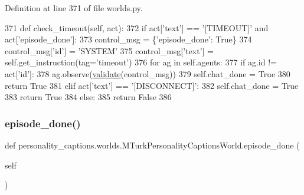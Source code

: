 Definition at line 371 of file worlds.\+py.


\begin{DoxyCode}
371     \textcolor{keyword}{def }check\_timeout(self, act):
372         \textcolor{keywordflow}{if} act[\textcolor{stringliteral}{'text'}] == \textcolor{stringliteral}{'[TIMEOUT]'} \textcolor{keywordflow}{and} act[\textcolor{stringliteral}{'episode\_done'}]:
373             control\_msg = \{\textcolor{stringliteral}{'episode\_done'}: \textcolor{keyword}{True}\}
374             control\_msg[\textcolor{stringliteral}{'id'}] = \textcolor{stringliteral}{'SYSTEM'}
375             control\_msg[\textcolor{stringliteral}{'text'}] = self.get\_instruction(tag=\textcolor{stringliteral}{'timeout'})
376             \textcolor{keywordflow}{for} ag \textcolor{keywordflow}{in} self.agents:
377                 \textcolor{keywordflow}{if} ag.id != act[\textcolor{stringliteral}{'id'}]:
378                     ag.observe(\hyperlink{namespaceparlai_1_1core_1_1worlds_afc3fad603b7bce41dbdc9cdc04a9c794}{validate}(control\_msg))
379             self.chat\_done = \textcolor{keyword}{True}
380             \textcolor{keywordflow}{return} \textcolor{keyword}{True}
381         \textcolor{keywordflow}{elif} act[\textcolor{stringliteral}{'text'}] == \textcolor{stringliteral}{'[DISCONNECT]'}:
382             self.chat\_done = \textcolor{keyword}{True}
383             \textcolor{keywordflow}{return} \textcolor{keyword}{True}
384         \textcolor{keywordflow}{else}:
385             \textcolor{keywordflow}{return} \textcolor{keyword}{False}
386 
\end{DoxyCode}
\mbox{\label{classpersonality__captions_1_1worlds_1_1MTurkPersonalityCaptionsWorld_a579f1033a02ede69365f79246a23d8da}} 
\subsubsection{\texorpdfstring{episode\+\_\+done()}{episode\_done()}}
{\footnotesize\ttfamily def personality\+\_\+captions.\+worlds.\+M\+Turk\+Personality\+Captions\+World.\+episode\+\_\+done (\begin{DoxyParamCaption}\item[{}]{self }\end{DoxyParamCaption})}



